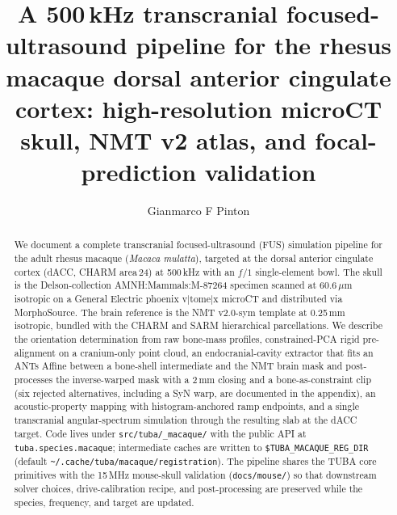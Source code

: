 \documentclass{compactarticle}
\begin{document}
\justifying
{}


\title{A 500\,kHz transcranial focused-ultrasound pipeline for the rhesus
       macaque dorsal anterior cingulate cortex: high-resolution microCT
       skull, NMT v2 atlas, and focal-prediction validation}

\author{Gianmarco F Pinton}




\begin{abstract}
We document a complete transcranial focused-ultrasound (FUS) simulation
pipeline for the adult rhesus macaque (\emph{Macaca mulatta}), targeted
at the dorsal anterior cingulate cortex (dACC, CHARM area\,24) at
500\,kHz with an $f/1$ single-element bowl. The skull is the
Delson-collection AMNH:Mammals:M-87264 specimen scanned at 60.6\,$\mu$m
isotropic on a General Electric phoenix v$\vert$tome$\vert$x microCT and
distributed via MorphoSource. The brain reference is the NMT v2.0-sym
template at 0.25\,mm isotropic, bundled with the CHARM and SARM
hierarchical parcellations. We describe the orientation determination
from raw bone-mass profiles, constrained-PCA rigid pre-alignment on a
cranium-only point cloud, an endocranial-cavity extractor that fits an
ANTs Affine between a bone-shell intermediate and the NMT brain mask
and post-processes the inverse-warped mask with a 2\,mm closing and a
bone-as-constraint clip (six rejected alternatives, including a SyN
warp, are documented in the appendix), an acoustic-property mapping
with histogram-anchored ramp endpoints, and a single transcranial
angular-spectrum simulation through the resulting slab at the dACC
target. Code lives under \texttt{src/tuba/\_macaque/} with the public
API at \texttt{tuba.species.macaque}; intermediate caches are written
to \texttt{\$TUBA\_MACAQUE\_REG\_DIR} (default
\texttt{\textasciitilde/.cache/tuba/macaque/registration}). The
pipeline shares the TUBA core primitives with the 15\,MHz mouse-skull
validation (\texttt{docs/mouse/}) so that downstream solver choices,
drive-calibration recipe, and post-processing are preserved while the
species, frequency, and target are updated.
\end{abstract}
\end{document}
